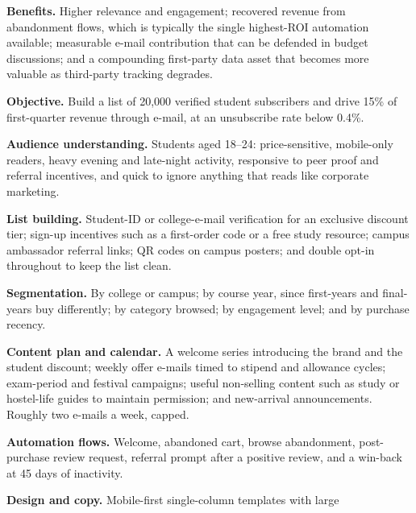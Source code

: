 \begin{qlist}
\textbf{Benefits.} Higher relevance and engagement; recovered revenue from
abandonment flows, which is typically the single highest-ROI automation
available; measurable e-mail contribution that can be defended in budget
discussions; and a compounding first-party data asset that becomes more
valuable as third-party tracking degrades.

\begin{apts}
\item \textbf{Objective.} Build a list of 20{,}000 verified student subscribers
      and drive 15\% of first-quarter revenue through e-mail, at an unsubscribe
      rate below 0.4\%.
\item \textbf{Audience understanding.} Students aged 18--24: price-sensitive,
      mobile-only readers, heavy evening and late-night activity, responsive to
      peer proof and referral incentives, and quick to ignore anything that
      reads like corporate marketing.
\item \textbf{List building.} Student-ID or college-e-mail verification for an
      exclusive discount tier; sign-up incentives such as a first-order code or
      a free study resource; campus ambassador referral links; QR codes on
      campus posters; and double opt-in throughout to keep the list clean.
\item \textbf{Segmentation.} By college or campus; by course year, since
      first-years and final-years buy differently; by category browsed; by
      engagement level; and by purchase recency.
\item \textbf{Content plan and calendar.} A welcome series introducing the brand
      and the student discount; weekly offer e-mails timed to stipend and
      allowance cycles; exam-period and festival campaigns; useful non-selling
      content such as study or hostel-life guides to maintain permission; and
      new-arrival announcements. Roughly two e-mails a week, capped.
\item \textbf{Automation flows.} Welcome, abandoned cart, browse abandonment,
      post-purchase review request, referral prompt after a positive review, and
      a win-back at 45 days of inactivity.
\item \textbf{Design and copy.} Mobile-first single-column templates with large

\end{apts}
\end{qlist}
